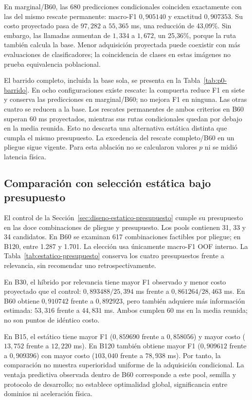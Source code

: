 En marginal/B60, las 680 predicciones condicionales coinciden exactamente con las del mismo rescate permanente: macro-F1 $0{,}905140$ y exactitud $0{,}907353$. Su costo proyectado pasa de $97{,}282$ a $55{,}365$ ms, una reducción de 43,09\%. Sin embargo, las llamadas aumentan de $1{,}334$ a $1{,}672$, un 25,36\%, porque la ruta también calcula la base. Menor adquisición proyectada puede coexistir con más evaluaciones de clasificadores; la coincidencia de clases en estas imágenes no prueba equivalencia poblacional.

El barrido completo, incluida la base sola, se presenta en la Tabla~\ref{tab:p0-barrido}. En ocho configuraciones existe rescate: la compuerta reduce F1 en siete y conserva las predicciones en marginal/B60; no mejora F1 en ninguna. Las otras cuatro se reducen a la base. Los rescates permanentes de ambos criterios en B60 superan 60 ms proyectados, mientras sus rutas condicionales quedan por debajo en la media reunida. Esto no descarta una alternativa estática distinta que cumpla el mismo presupuesto. La excedencia del rescate completo/B60 en un pliegue sigue vigente. Para esta ablación no se calcularon valores $p$ ni se midió latencia física.

\subsection{Comparación con selección estática bajo presupuesto}\label{sec:resultados-estatico-presupuesto}
El control de la Sección~\ref{sec:diseno-estatico-presupuesto} cumple su presupuesto en las doce combinaciones de pliegue y presupuesto. Los pools contienen 31, 33 y 34 candidatos. En B60 se examinan 617 combinaciones factibles por pliegue; en B120, entre 1.287 y 1.701. La elección usa únicamente macro-F1 OOF interno. La Tabla~\ref{tab:estatico-presupuesto} conserva los cuatro presupuestos frente a relevancia, sin recomendar uno retrospectivamente.



En B30, el híbrido por relevancia tiene mayor F1 observado y menor costo proyectado que el control: $0{,}893488/25{,}394$ ms frente a $0{,}861264/28{,}463$ ms. En B60 obtiene $0{,}910742$ frente a $0{,}892923$, pero también adquiere más información estimada: $53{,}316$ frente a $44{,}831$ ms. Ambos cumplen 60 ms en la media reunida; no son puntos de idéntico costo.

En B15, el estático tiene mayor F1 ($0{,}859690$ frente a $0{,}858056$) y mayor costo ($13{,}752$ frente a $12{,}220$ ms). En B120 también obtiene mayor F1 ($0{,}909612$ frente a $0{,}909396$) con mayor costo ($103{,}040$ frente a $78{,}938$ ms). Por tanto, la comparación no muestra superioridad uniforme de la adquisición condicional. La ventaja predictiva observada dentro de B60 corresponde a este pool, semilla y protocolo de desarrollo; no establece optimalidad global, significancia entre dominios ni aceleración física.
\FloatBarrier

